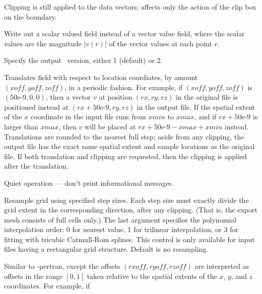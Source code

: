 \begin{description}
  Clipping is still applied to the data vectors;  affects
  only the action of the clip box on the boundary.
\item[\optkey{-mag}]
  Write out a scalar valued field instead of a vector value field, where
  the scalar values are the magnitude $|v(r)|$ of the vector values at
  each point $r$.
\item[\optkey{-ovfversion version}]
  Specify the output \OVF\ version, either 1 (default) or 2.
\item[\optkey{-pertran xoff yoff zoff}]
  Translates field with respect to location coordiates, by amount
  $(\mathit{xoff},\mathit{yoff},\mathit{zoff})$, in a periodic
  fashion.  For example, if
  $(\mathit{xoff},\mathit{yoff},\mathit{zoff})$ is $(\mbox{50e-9},0,0)$,
  then a vector $v$ at position
  $(\mathit{rx},\mathit{ry},\mathit{rz})$
  in the original file is positioned instead at
  $(\mathit{rx} + \mbox{50e-9},\mathit{ry},\mathit{rz})$
  in the output file.  If the spatial extent of the
  $x$ coordinate in the input file runs from $\mathit{xmin}$ to
  $\mathit{xmax}$, and if
  $\mathit{rx} +\mbox{50e-9}$ is larger than $\mathit{xmax}$, then $v$
  will be placed at
  $\mathit{rx} + \mbox{50e-9} - \mathit{xmax} + \mathit{xmin}$
  instead.  Translations are rounded to the
  nearest full step; aside from any clipping, the output file has the
  exact same spatial extent and sample locations as the original file.
  If both translation and clipping are requested, then the clipping is
  applied after the translation.
\item[\optkey{-q}]
  Quiet operation --- don't print informational messages.
\item[\optkey{-resample xstep ystep zstep \boa 0\pipe 1\pipe 3\bca}]
  Resample grid using specified step sizes.  Each step size must exactly
  divide the grid extent in the corresponding direction, after any
  clipping.  (That is, the export mesh consists of full cells only.)
  The last argument specifies the polynomial interpolation order: 0 for
  nearest value, 1 for trilinear interpolation, or 3 for fitting with
  tricubic Catmull-Rom splines.  This control is only available for
  input files having a rectangular grid structure.  Default is no
  resampling.
\item[\optkey{-rpertran rxoff ryoff rzoff}]
  Similar to -pertran, except the offsets
  $(\mathit{rxoff},\mathit{ryoff},\mathit{rzoff})$ are
  interpreted as offsets in the range $[0,1]$ taken relative to the
  spatial extents of the $x$, $y$, and $z$ coordinates.  For example, if

\end{description}
